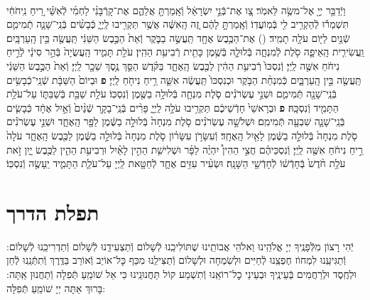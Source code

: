 \documentclass[twoside, openany, parskip=half, 11pt]{book}
\begin{document}
\begin{footnotesize}
\begin{multicols}{2}
\\
וַיְֿדַבֵּ֥ר יְיָ֖ אֶל־משֶׂ֥ה לֵּאמֹֽר׃ צַ֚ו אֶת־בְּֿנֵ֣י יִשְׂרָאֵ֔ל וְֿאָֽמַרְתָּ֖ אֲלֵהֶ֑ם אֶת־קָרְֿבָּנִ֨י לַחְמִ֜י לְֿאִשַּׁ֗י רֵ֚יחַ נִֽיחֹחִ֔י תִּשְׁמְר֕וּ לְֿהַקְרִ֥יב לִ֖י בְּֿמֽוֹעֲדֽוֹ׃
וְֿאָֽמַרְתָּ֣ לָהֶ֔ם זֶ֚ה הָֽאִשֶּׁ֔ה אֲשֶׁ֥ר תַּקְרִ֖יבוּ לַֽיְיָ֑ כְּֿבָשִׂ֨ים בְּֿנֵֽי־שָׁנָ֧ה תְֿמִימִ֛ם שְֿׁנַ֥יִם לַיּ֖וֹם עֹלָ֥ה תָמִֽיד׃
()
אֶת־הַכֶּ֥בֶשׂ אֶחָ֖ד תַּֽעֲשֶׂ֣ה בַבֹּ֑קֶר וְֿאֵת֙ הַכֶּ֣בֶשׂ הַשֵּׁנִ֔י תַּֽעֲשֶׂ֖ה בֵּ֥ין הָֽעַרְבָּֽיִם׃ וַֽעֲשִׂירִ֧ית הָֽאֵיפָ֛ה סֹ֖לֶת לְֿמִנְחָ֑ה בְּֿלוּלָ֛ה בְּֿשֶׁ֥מֶן כָּתִ֖ית רְֿבִיעִ֥ת הַהִֽין׃
עֹלַ֖ת תָּמִ֑יד הָֽעֲשֻׂיָה֙ בְּֿהַ֣ר סִינַ֔י לְֿרֵ֣יחַ נִיחֹ֔חַ אִשֶּׁ֖ה לַֽיְיָ׃ וְֿנִסְכּוֹ֙ רְֿבִיעִ֥ת הַהִ֔ין לַכֶּ֖בֶשׂ הָֽאֶחָ֑ד בַּקֹּ֗דֶשׁ הַסֵּ֛ךְ נֶ֥סֶךְ שֵׁכָ֖ר לַֽיְיָ׃ וְֿאֵת֙ הַכֶּ֣בֶשׂ הַשֵּׁנִ֔י תַּֽעֲשֶׂ֖ה בֵּ֣ין הָֽעַרְבָּ֑יִם כְּֿמִנְחַ֨ת הַבֹּ֤קֶר וּכְנִסְכּוֹ֙ תַּֽעֲשֶׂ֔ה אִשֵּׁ֛ה רֵ֥יחַ נִיחֹ֖חַ לַֽיְיָ׃ \textbf{פ}
וּבְיוֹם֙ הַשַּׁבָּ֔ת שְֿׁנֵֽי־כְֿבָשִׂ֥ים בְּֿנֵֽי־שָׁנָ֖ה תְּֿמִימִ֑ם וּשְׁנֵ֣י עֶשְׂרֹנִ֗ים סֹ֧לֶת מִנְחָ֛ה בְּֿלוּלָ֥ה בַשֶּׁ֖מֶן וְֿנִסְכּֽוֹ׃ עֹלַ֥ת שַׁבַּ֖ת בְּֿשַׁבַּתּ֑וֹ עַל־עֹלַ֥ת הַתָּמִ֖יד וְֿנִסְכָּֽהּ׃ \textbf{פ}
וּבְרָאשֵׁי֙ חָדְֿשֵׁיכֶ֔ם תַּקְרִ֥יבוּ עֹלָ֥ה לַֽיְיָ֑ פָּרִ֨ים בְּֿנֵֽי־בָקָ֤ר שְֿׁנַ֨יִם֙ וְֿאַ֣יִל אֶחָ֔ד כְּֿבָשִׂ֧ים בְּֿנֵֽי־שָׁנָ֛ה שִׁבְעָ֖ה תְּֿמִימִֽם׃ וּשְׁלֹשָׁ֣ה עֶשְׂרֹנִ֗ים סֹ֤לֶת מִנְחָה֙ בְּֿלוּלָ֣ה בַשֶּׁ֔מֶן לַפָּ֖ר הָֽאֶחָ֑ד וּשְׁנֵ֣י עֶשְׂרֹנִ֗ים סֹ֤לֶת מִנְחָה֙ בְּֿלוּלָ֣ה בַשֶּׁ֔מֶן לָאַ֖יִל הָֽאֶחָֽד׃ וְֿעִשָּׂרֹ֣ן עִשָּׂר֗וֹן סֹ֤לֶת מִנְחָה֙ בְּֿלוּלָ֣ה בַשֶּׁ֔מֶן לַכֶּ֖בֶשׂ הָֽאֶחָ֑ד עֹלָה֙ רֵ֣יחַ נִיחֹ֔חַ אִשֶּׁ֖ה לַֽיְיָ׃ וְֿנִסְכֵּיהֶ֗ם חֲצִ֣י הַהִין֩ יִהְיֶ֨ה לַפָּ֜ר וּשְׁלִישִׁ֧ת הַהִ֣ין לָאַ֗יִל וּרְבִיעִ֥ת הַהִ֛ין לַכֶּ֖בֶשׂ יָ֑יִן זֹ֣את עֹלַ֥ת חֹ֨דֶשׁ֙ בְּֿחָדְֿשׁ֔וֹ לְֿחָדְֿשֵׁ֖י הַשָּׁנָֽה׃ וּשְׂעִ֨יר עִזִּ֥ים אֶחָ֛ד לְֿחַטָּ֖את לַֽיְיָ עַל־עֹלַ֧ת הַתָּמִ֛יד יֵֽעָשֶׂ֖ה וְֿנִסְכּֽוֹ׃

\end{multicols}

\end{footnotesize}

\chapter{תפלת הדרך}

יְֿהִי רָצוֹן מִלְּֿפָנֶֽיךָ יְיָ אֱלֹהֵֽינוּ וֵאלֹהֵי אֲבוֹתֵֽינוּ שֶׁתּוֹלִיכֵֽנוּ לְֿשָׁלוֹם וְֿתַצְעִידֵֽנוּ לְֿשָׁלוֹם וְֿתַדְרִיכֵֽנוּ לְֿשָׁלוֹם: וְֿתַגִּיעֵֽנוּ לִמְחוֹז חֶפְצֵֽנוּ לְֿחַיִּים וּלְשִׂמְחָה וּלְשָׁלוֹם וְֿתַצִּילֵֽנוּ מִכַּף כׇּל־אוֹיֵב וְֿאוֹרֵב בַּדֶּֽרֶךְ וְֿתִתְּֿנֵֽנוּ לְֿחֵן וּלְחֶֽסֶד וּלְרַחֲמִים בְּֿעֵינֶֽיךָ וּבְעֵינֵי כׇל־רוֹאֵֽנוּ וְֿתִשְׁמַע קוֹל תַּחֲנוּנֵֽינוּ כִּי אֵל שׁוֹמֵֽעַ תְּֿפִלָה וְֿתַחֲנוּן אַֽתָּה: בָּרוּךְ אַתָּה יְיָ שׁוֹמֵֽעַ תְּֿפִלָּה:\\

\clearpage

\blankpage
\end{document}
